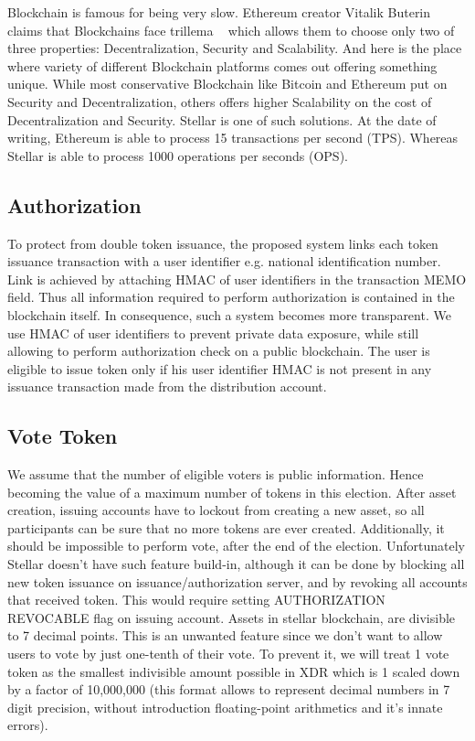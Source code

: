\documentclass[runningheads]{llncs}
\begin{document}
Blockchain is famous for being very slow. Ethereum creator Vitalik Buterin claims that Blockchains face trillema ~\cite{ethereum} which allows them to choose only two of three properties: Decentralization, Security and Scalability. And here is the place where variety of different Blockchain platforms comes out offering something unique. While most conservative Blockchain like Bitcoin and Ethereum put on Security and Decentralization, others offers higher Scalability on the cost of Decentralization and Security. Stellar is one of such solutions. 
At the date of writing, Ethereum is able to process 15 transactions per second (TPS). Whereas Stellar is able to process 1000 operations per seconds (OPS). 

\subsection{Authorization}
To protect from double token issuance, the proposed system links each token issuance transaction with a user identifier e.g. national identification number. Link is achieved by attaching HMAC of user identifiers in the transaction MEMO field. Thus all information required to perform authorization is contained in the blockchain itself. In consequence, such a system becomes more transparent. We use HMAC of user identifiers to prevent private data exposure, while still allowing to perform authorization check on a public blockchain. The user is eligible to issue token only if his user identifier HMAC is not present in any issuance transaction made from the distribution account.

\subsection{Vote Token}
We assume that the number of eligible voters is public information. Hence becoming the value of a maximum number of tokens in this election. After asset creation, issuing accounts have to lockout from creating a new asset, so all participants can be sure that no more tokens are ever created. Additionally, it should be impossible to perform vote, after the end of the election. Unfortunately Stellar doesn’t have such feature build-in, although it can be done by blocking all new token issuance on issuance/authorization server, and by revoking all accounts that received token. This would require setting AUTHORIZATION REVOCABLE flag on issuing account.
Assets in stellar blockchain, are divisible to 7 decimal points. This is an unwanted feature since we don’t want to allow users to vote by just one-tenth of their vote. To prevent it, we will treat 1 vote token as the smallest indivisible amount possible in XDR which is 1 scaled down by a factor of 10,000,000 (this format allows to represent decimal numbers in 7 digit precision, without introduction floating-point arithmetics and it’s innate errors).
\end{document}
